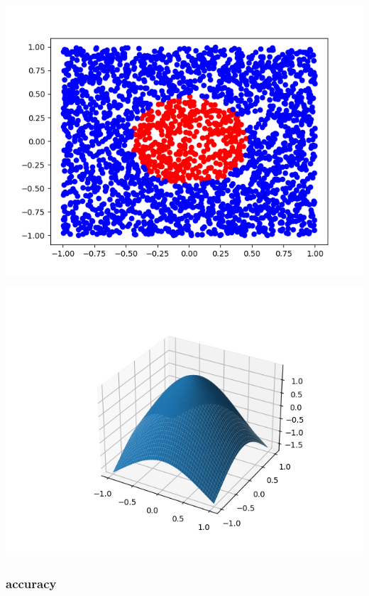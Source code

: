\documentclass[11pt]{article}
\begin{document}
\begin{center}
\includegraphics[scale=0.7]{./res/ac_points_rbf_0.3.png}
\end{center}

\begin{center}
\includegraphics[scale=0.7]{./res/ac_surface_rbf_0.3.png}
\end{center}

\subsubsection*{accuracy}
\label{sec:org14b0499}
\end{document}
